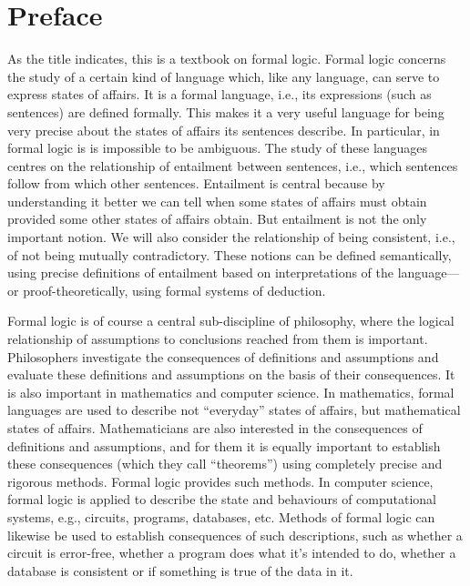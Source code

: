 \chapter{Preface}

As the title indicates, this is a textbook on formal logic.  Formal logic concerns the study of a certain kind of language which, like any language, can serve to express states of affairs.  It is a formal language, i.e., its expressions (such as sentences) are defined formally.  This makes it a very useful language for being very precise about the states of affairs its sentences describe. In particular, in formal logic is is impossible to be ambiguous. The study of these languages centres on the relationship of entailment between sentences, i.e., which sentences follow from which other sentences.  Entailment is central because by understanding it better we can tell when some states of affairs must obtain provided some other states of affairs obtain.  But entailment is not the only important notion. We will also consider the relationship of being consistent, i.e., of not being mutually contradictory.  These notions can be defined semantically, using precise definitions of entailment based on interpretations of the language---or proof-theoretically, using formal systems of deduction.

Formal logic is of course a central sub-discipline of philosophy, where the logical relationship of assumptions to conclusions reached from them is important.  Philosophers investigate the consequences of definitions and assumptions and evaluate these definitions and assumptions on the basis of their consequences. It is also important in mathematics and computer science. In mathematics, formal languages are used to describe not ``everyday'' states of affairs, but mathematical states of affairs. Mathematicians are also interested in the consequences of definitions and assumptions, and for them it is equally important to establish these consequences (which they call ``theorems'') using completely precise and rigorous methods. Formal logic provides such methods.  In computer science, formal logic is applied to describe the state and behaviours of computational systems, e.g., circuits, programs, databases, etc.  Methods of formal logic can likewise be used to establish consequences of such descriptions, such as whether a circuit is error-free, whether a program does what it's intended to do, whether a database is consistent or if something is true of the data in it.

